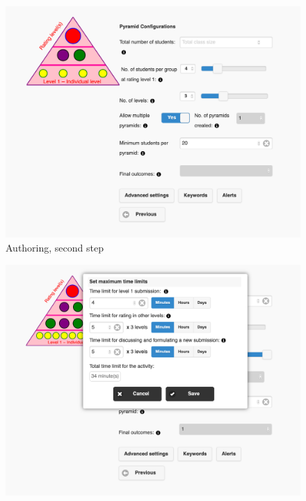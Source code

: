 \begin{figure}[!h]
    \includegraphics[clip,width=\columnwidth]{Figures/pyramidapp2.png}%
\caption{Authoring, second step}
\label{fig:P2}
\end{figure}
\begin{figure}[!h]
    \includegraphics[clip,width=\columnwidth]{Figures/pyramidapp3.png}%
\caption{}
\label{fig:P3}
\end{figure}
